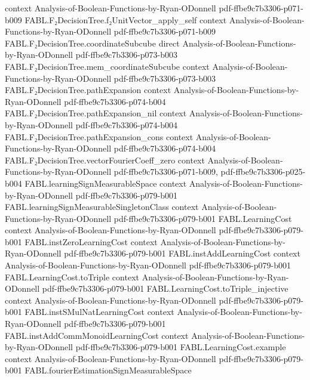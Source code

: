 \begin{theorem}
  {context}
  {Analysis-of-Boolean-Functions-by-Ryan-ODonnell}
  {pdf-ffbe9c7b3306-p071-b009}
\proofstep
  {FABL.F₂DecisionTree.f₂UnitVector_apply_self}
  {context}
  {Analysis-of-Boolean-Functions-by-Ryan-ODonnell}
  {pdf-ffbe9c7b3306-p071-b009}
\proofstep
  {FABL.F₂DecisionTree.coordinateSubcube}
  {direct}
  {Analysis-of-Boolean-Functions-by-Ryan-ODonnell}
  {pdf-ffbe9c7b3306-p073-b003}
\proofstep
  {FABL.F₂DecisionTree.mem_coordinateSubcube}
  {context}
  {Analysis-of-Boolean-Functions-by-Ryan-ODonnell}
  {pdf-ffbe9c7b3306-p073-b003}
\proofstep
  {FABL.F₂DecisionTree.pathExpansion}
  {context}
  {Analysis-of-Boolean-Functions-by-Ryan-ODonnell}
  {pdf-ffbe9c7b3306-p074-b004}
\proofstep
  {FABL.F₂DecisionTree.pathExpansion_nil}
  {context}
  {Analysis-of-Boolean-Functions-by-Ryan-ODonnell}
  {pdf-ffbe9c7b3306-p074-b004}
\proofstep
  {FABL.F₂DecisionTree.pathExpansion_cons}
  {context}
  {Analysis-of-Boolean-Functions-by-Ryan-ODonnell}
  {pdf-ffbe9c7b3306-p074-b004}
\proofstep
  {FABL.F₂DecisionTree.vectorFourierCoeff_zero}
  {context}
  {Analysis-of-Boolean-Functions-by-Ryan-ODonnell}
  {pdf-ffbe9c7b3306-p071-b009,
    pdf-ffbe9c7b3306-p025-b004}
\proofstep
  {FABL.learningSignMeasurableSpace}
  {context}
  {Analysis-of-Boolean-Functions-by-Ryan-ODonnell}
  {pdf-ffbe9c7b3306-p079-b001}
\proofstep
  {FABL.learningSignMeasurableSingletonClass}
  {context}
  {Analysis-of-Boolean-Functions-by-Ryan-ODonnell}
  {pdf-ffbe9c7b3306-p079-b001}
\proofstep
  {FABL.LearningCost}
  {context}
  {Analysis-of-Boolean-Functions-by-Ryan-ODonnell}
  {pdf-ffbe9c7b3306-p079-b001}
\proofstep
  {FABL.instZeroLearningCost}
  {context}
  {Analysis-of-Boolean-Functions-by-Ryan-ODonnell}
  {pdf-ffbe9c7b3306-p079-b001}
\proofstep
  {FABL.instAddLearningCost}
  {context}
  {Analysis-of-Boolean-Functions-by-Ryan-ODonnell}
  {pdf-ffbe9c7b3306-p079-b001}
\proofstep
  {FABL.LearningCost.toTriple}
  {context}
  {Analysis-of-Boolean-Functions-by-Ryan-ODonnell}
  {pdf-ffbe9c7b3306-p079-b001}
\proofstep
  {FABL.LearningCost.toTriple_injective}
  {context}
  {Analysis-of-Boolean-Functions-by-Ryan-ODonnell}
  {pdf-ffbe9c7b3306-p079-b001}
\proofstep
  {FABL.instSMulNatLearningCost}
  {context}
  {Analysis-of-Boolean-Functions-by-Ryan-ODonnell}
  {pdf-ffbe9c7b3306-p079-b001}
\proofstep
  {FABL.instAddCommMonoidLearningCost}
  {context}
  {Analysis-of-Boolean-Functions-by-Ryan-ODonnell}
  {pdf-ffbe9c7b3306-p079-b001}
\proofstep
  {FABL.LearningCost.example}
  {context}
  {Analysis-of-Boolean-Functions-by-Ryan-ODonnell}
  {pdf-ffbe9c7b3306-p079-b001}
\proofstep
  {FABL.fourierEstimationSignMeasurableSpace}

\end{theorem}
